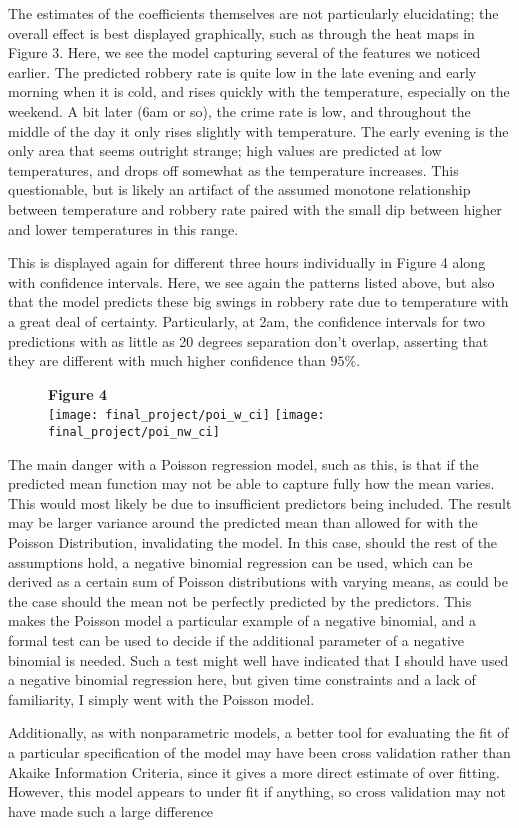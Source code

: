 \documentclass[11pt]{article}
\theoremstyle{definition}
\begin{document}
The estimates of the coefficients themselves are not particularly elucidating; the overall effect is best displayed graphically, such as through the heat maps in Figure 3. Here, we see the model capturing several of the features we noticed earlier. The predicted robbery rate is quite low in the late evening and early morning when it is cold, and rises quickly with the temperature, especially on the weekend. A bit later (6am or so), the crime rate is low, and throughout the middle of the day it only rises slightly with temperature. The early evening is the only area that seems outright strange; high values are predicted at low temperatures, and drops off somewhat as the temperature increases. This questionable, but is likely an artifact of the assumed monotone relationship between temperature and robbery rate paired with the small dip between higher and lower temperatures in this range. \par
This is displayed again for different three hours individually in Figure 4 along with confidence intervals. Here, we see again the patterns listed above, but also that the model predicts these big swings in robbery rate due to temperature with a great deal of certainty. Particularly, at 2am, the confidence intervals for two predictions with as little as 20 degrees separation don't overlap, asserting that they are different with much higher confidence than $95\%$. \par

\begin{figure}[h]
    {\bf Figure 4} \\
    \texttt{[image: final\_project/poi\_w\_ci]}
    \texttt{[image: final\_project/poi\_nw\_ci]}
\end{figure}

The main danger with a Poisson regression model, such as this, is that if the predicted mean function may not be able to capture fully how the mean varies. This would most likely be due to insufficient predictors being included. The result may be larger variance around the predicted mean than allowed for with the Poisson Distribution, invalidating the model. In this case, should the rest of the assumptions hold, a negative binomial regression can be used, which can be derived as a certain sum of Poisson distributions with varying means, as could be the case should the mean not be perfectly predicted by the predictors. This makes the Poisson model a particular example of a negative binomial, and a formal test can be used to decide if the additional parameter of a negative binomial is needed. Such a test might well have indicated that I should have used a negative binomial regression here, but given time constraints and a lack of familiarity, I simply went with the Poisson model. \par
Additionally, as with nonparametric models, a better tool for evaluating the fit of a particular specification of the model may have been cross validation rather than Akaike Information Criteria, since it gives a more direct estimate of over fitting. However, this model appears to under fit if anything, so cross validation may not have made such a large difference
\end{document}
